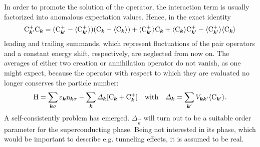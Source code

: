 In order to promote the solution of the  operator, the
interaction term is usually factorized into anomalous expectation values. Hence,
in the exact identity \cite[Eq.~4.20]{Nolting15}
%
\begin{equation*}
	\mathrm C_{\boldsymbol k'}^+ \mathrm C_{\boldsymbol k} =
    (\mathrm C_{\boldsymbol k'}^+ - \langle\mathrm C_{\boldsymbol k'}^+\rangle)
    (\mathrm C_{\boldsymbol k} - \langle\mathrm C_{\boldsymbol k}\rangle)
    + \langle\mathrm C_{\boldsymbol k'}^+\rangle \mathrm C_{\boldsymbol k}
    + \langle\mathrm C_{\boldsymbol k}\rangle \mathrm C_{\boldsymbol k'}^+
    - \langle\mathrm C_{\boldsymbol k'}^+\rangle \langle\mathrm C_{\boldsymbol k}\rangle
\end{equation*}
%
leading and trailing summands, which represent fluctuations of the 
pair operators and a constant energy shift, respectively, are neglected from now
on. The averages of either two creation or annihilation operator do not vanish,
as one might expect, because the  operator with respect to which
they are evaluated no longer conserves the particle number:
%
\begin{equation} \label{BCS order parameter}
    \mathrm H = \sum_{\boldsymbol k \sigma} \varepsilon_{\boldsymbol k} \mathrm n_{\boldsymbol k \sigma}
    - \sum_{\boldsymbol k} \varDelta_{\boldsymbol k} [\mathrm C_{\boldsymbol k} + \mathrm C_{\boldsymbol k}^+]
    \quad \text{with} \quad
    \varDelta_{\boldsymbol k} = \sum_{\boldsymbol k'} V_{\boldsymbol k \boldsymbol k'} \langle\mathrm C_{\boldsymbol k'}\rangle.
\end{equation}
%
A self-consistently problem has emerged. $\Delta_{\vec k}$ will turn out to be a
suitable order parameter for the superconducting phase. Being not interested in
its phase, which would be important to describe e.g. tunneling effects, it is
assumed to be real.


